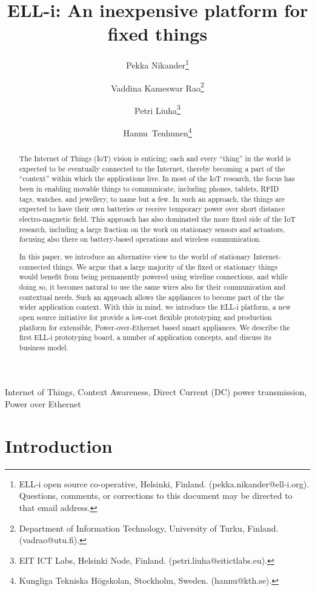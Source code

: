 \documentclass[final]{siamltex}
\title{{ELL-i}: An inexpensive platform for fixed things}
\author{Pekka Nikander\thanks{{ELL-i} open source co-operative,
    Helsinki, Finland. (pekka.nikander@ell-i.org).  Questions, comments,
    or corrections to this document may be directed to that email
    address.}
  \and Vaddina Kameswar Rao\thanks{Department of Information
    Technology, University of Turku, Finland. (vadrao@utu.fi).}
  \and Petri Liuha\thanks{EIT ICT Labs, Helsinki Node,
    Finland. (petri.liuha@eitictlabs.eu).}
  \and \hbox{Hannu Tenhunen}\thanks{Kungliga Tekniska H\"{o}gskolan,
    Stockholm, Sweden. (hannu@kth.se).}}
\begin{document}
\maketitle

\begin{abstract}
The Internet of Things (IoT) vision is enticing; each and every
``thing'' in the world is expected to be eventually connected to the
Internet, thereby becoming a part of the ``context'' within which the
applications live.  
In most of the IoT research, the focus has been in enabling
movable things to communicate, including phones, tablets, RFID tags,
watches, and jewellery, to name but a few.  In such an approach, the
things are expected to have their own batteries or receive temporary
power over short distance electro-magnetic field.
This approach has also dominated the more fixed side of the
IoT research, including a large fraction on the work on stationary
sensors and actuators, focusing also there on battery-based operations
and wireless communication. 

In this paper, we introduce an alternative view to the world
of stationary Internet-connected things.  
We argue that a large majority of the fixed or
stationary things would benefit from being permanently powered using
wireline connections, and while doing so, it becomes natural to use
the same wires also for their communication and contextual needs.
Such an approach allows the appliances to become part of the
the wider application context.  With this in mind,
we introduce the
ELL-i platform, a new open source initiative for provide a low-cost
flexible prototyping and production platform for extensible,
Power-over-Ethernet based smart appliances.  We describe the first
ELL-i prototyping board,
a number of application concepts, and discuss its
business model. 
\end{abstract}

\begin{keywords} 
Internet of Things, Context Awareness, Direct Current (DC) power
transmission, Power over Ethernet
\end{keywords}

\pagestyle{myheadings}
\thispagestyle{plain}


\section{Introduction}
\end{document}
